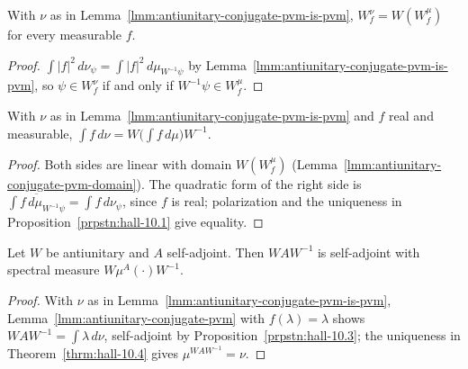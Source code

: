 \begin{lemma}
    \label{lmm:antiunitary-conjugate-pvm-domain}
    \leanok
    With $\nu$ as in Lemma~\ref{lmm:antiunitary-conjugate-pvm-is-pvm}, $W^\nu_f = W(W^\mu_f)$ for every measurable $f$.
\end{lemma}
\begin{proof}
    \leanok
    $\int |f|^2 \, d\nu_\psi = \int |f|^2 \, d\mu_{W^{-1}\psi}$ by Lemma~\ref{lmm:antiunitary-conjugate-pvm-is-pvm}, so $\psi \in W^\nu_f$ if and only if $W^{-1}\psi \in W^\mu_f$.
\end{proof}

\begin{lemma}
    \label{lmm:antiunitary-conjugate-pvm}
    \leanok
    With $\nu$ as in Lemma~\ref{lmm:antiunitary-conjugate-pvm-is-pvm} and $f$ real and measurable, $\int f \, d\nu = W\big( \int f \, d\mu \big) W^{-1}$.
\end{lemma}
\begin{proof}
    \leanok
    Both sides are linear with domain $W(W^\mu_f)$ (Lemma~\ref{lmm:antiunitary-conjugate-pvm-domain}). The quadratic form of the right side is $\overline{\int f \, d\mu_{W^{-1}\psi}} = \int f \, d\nu_\psi$, since $f$ is real; polarization and the uniqueness in Proposition~\ref{prpstn:hall-10.1} give equality.
\end{proof}

\begin{lemma}
    \label{lmm:antiunitary-conjugate-spectral-measure}
    \leanok
    Let $W$ be antiunitary and $A$ self-adjoint. Then $WAW^{-1}$ is self-adjoint with spectral measure $W\mu^A(\cdot)W^{-1}$.
\end{lemma}
\begin{proof}
    \leanok
    With $\nu$ as in Lemma~\ref{lmm:antiunitary-conjugate-pvm-is-pvm}, Lemma~\ref{lmm:antiunitary-conjugate-pvm} with $f(\lambda) = \lambda$ shows $WAW^{-1} = \int \lambda \, d\nu$, self-adjoint by Proposition~\ref{prpstn:hall-10.3}; the uniqueness in Theorem~\ref{thrm:hall-10.4} gives $\mu^{WAW^{-1}} = \nu$.
\end{proof}

